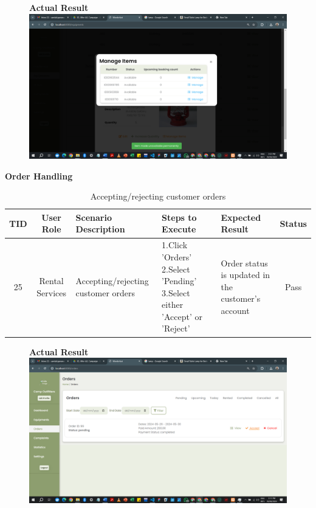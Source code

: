 \begin{figure}[h!]
    \centering
    \textbf{Actual Result}
    \includegraphics[width=1\textwidth]{Images/Test Cases/24. Making equipment temporarily unavailable.png}
\end{figure}
\clearpage


\textbf{Order Handling}\\
\begin{table}[ht]
\centering
\begin{tabularx}{\textwidth}{|c|c|X|X|X|c|}
\hline
\textbf{TID} & \textbf{User Role} & \textbf{Scenario Description} & \textbf{Steps to Execute} & \textbf{Expected Result} & \textbf{Status} \\ \hline
25 & Rental Services & Accepting/rejecting customer orders & 1.Click 'Orders' \newline2.Select 'Pending' \newline3.Select either 'Accept' or 'Reject' & Order status is updated in the customer's account & Pass \\ \hline
\end{tabularx}
\caption{Accepting/rejecting customer orders}
\end{table}

\begin{figure}[h!]
    \centering
    \textbf{Actual Result}
    \includegraphics[width=1\textwidth]{Images/Test Cases/25. Accepting customer orders.png}
\end{figure}
\clearpage


